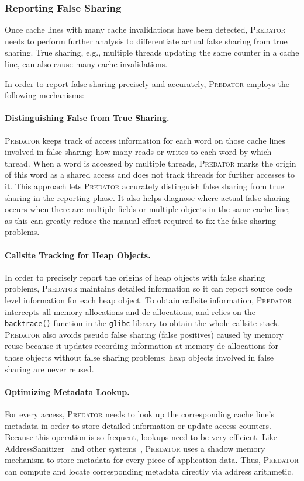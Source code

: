 \documentclass[10pt]{sigplanconf}
\newcommand{\Predator}{{\scshape Predator}}
\begin{document}
\subsubsection{Reporting False Sharing}

Once cache lines with many cache invalidations have been detected,
\Predator{} needs to perform further analysis to differentiate actual false sharing from true sharing. 
True sharing, e.g., multiple threads updating the same counter in a cache line, can also cause many cache invalidations.

In order to report false sharing precisely and accurately,  
\Predator{} employs the following mechanisms:

\paragraph{Distinguishing False from True Sharing.} \Predator{} keeps track of access information for each word on those cache lines involved in false sharing: how many reads or writes to each word by which thread.  When a word is accessed by multiple threads, \Predator{} marks the origin of this word as a shared access and does not track threads for further accesses to it. This approach lets \Predator{} accurately distinguish false sharing from true sharing in the reporting phase.  It also helps diagnose where
actual false sharing occurs when there are multiple fields or multiple
objects in the same cache line, as this can greatly reduce the manual
effort required to fix the false sharing problems.

\paragraph{Callsite Tracking for Heap Objects.} In order to precisely report the origins of heap objects with false
sharing problems, \Predator{} maintains detailed information so it can report source code level information for each heap
object. To obtain callsite information, \Predator{} intercepts all memory allocations and de-allocations, and relies
on the \texttt{backtrace()} function in the \texttt{glibc} library to obtain the whole callsite stack.
\Predator{} also avoids pseudo false sharing (false positives) caused by memory reuse because it updates recording information at memory de-allocations for those objects without false sharing problems; heap objects involved in false 
sharing are never reused.

\paragraph{Optimizing Metadata Lookup.}
For every access, \Predator{} needs to look up the corresponding cache line's metadata 
in order to store detailed information or update access counters. Because this operation is so frequent,
lookups need to be very efficient.
Like 
AddressSanitizer~\cite{Addresssanitizer} and other systems~\cite{qinzhaodetection,Valgrind},
\Predator{} uses a shadow memory mechanism to store metadata for every piece of application data. 
Thus, \Predator{} can compute and locate corresponding metadata directly via address arithmetic.
\end{document}
